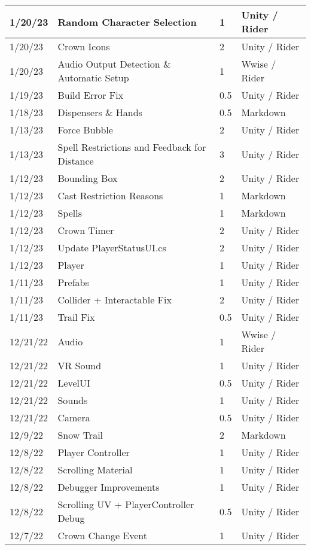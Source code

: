 \begin{longtable}{|p{1.5cm}|p{6cm}|p{1.2cm}|p{2.7cm}|}
	1/20/23 & Random Character Selection & 1 & Unity / Rider \\ \hline
	1/20/23 & Crown Icons & 2 & Unity / Rider \\ \hline
	1/20/23 & Audio Output Detection \& Automatic Setup & 1 & Wwise / Rider \\ \hline
	1/19/23 & Build Error Fix & 0.5 & Unity / Rider \\ \hline
	1/18/23 & Dispensers \& Hands & 0.5 & Markdown \\ \hline
	1/13/23 & Force Bubble & 2 & Unity / Rider \\ \hline
	1/13/23 & Spell Restrictions and Feedback for Distance & 3 & Unity / Rider \\ \hline
	1/12/23 & Bounding Box & 2 & Unity / Rider \\ \hline
	1/12/23 & Cast Restriction Reasons & 1 & Markdown \\ \hline
	1/12/23 & Spells & 1 & Markdown \\ \hline
	1/12/23 & Crown Timer & 2 & Unity / Rider \\ \hline
	1/12/23 & Update PlayerStatusUI.cs & 2 & Unity / Rider \\ \hline
	1/12/23 & Player & 1 & Unity / Rider \\ \hline
	1/11/23 & Prefabs & 1 & Unity / Rider \\ \hline
	1/11/23 & Collider + Interactable Fix & 2 & Unity / Rider \\ \hline
	1/11/23 & Trail Fix & 0.5 & Unity / Rider \\ \hline
	12/21/22 & Audio & 1 & Wwise / Rider \\ \hline
	12/21/22 & VR Sound & 1 & Unity / Rider \\ \hline
	12/21/22 & LevelUI & 0.5 & Unity / Rider \\ \hline
	12/21/22 & Sounds & 1 & Unity / Rider \\ \hline
	12/21/22 & Camera & 0.5 & Unity / Rider \\ \hline
	12/9/22 & Snow Trail & 2 & Markdown \\ \hline
	12/8/22 & Player Controller & 1 & Unity / Rider \\ \hline
	12/8/22 & Scrolling Material & 1 & Unity / Rider \\ \hline
	12/8/22 & Debugger Improvements & 1 & Unity / Rider \\ \hline
	12/8/22 & Scrolling UV + PlayerController Debug & 0.5 & Unity / Rider \\ \hline
	12/7/22 & Crown Change Event & 1 & Unity / Rider \\ \hline

\end{longtable}
